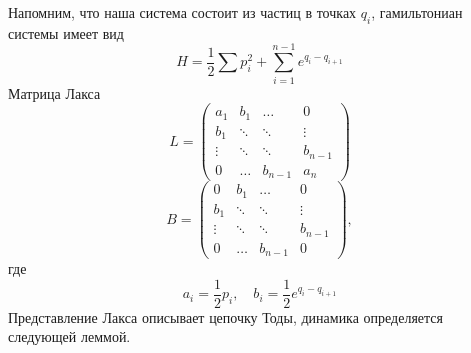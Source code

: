 \documentclass[a4paper,12pt]{article}
\theoremstyle{definition}
\theoremstyle{definition}
\theoremstyle{definition}
\begin{document}
Напомним, что наша система состоит из частиц в точках $q_{i}$, гамильтониан системы имеет вид
\begin{equation}
  \label{eq:1}
  H=\frac{1}{2}\sum p_{i}^{2}+ \sum_{i=1}^{n-1} e^{q_{i}-q_{i+1}}
\end{equation}
Матрица Лакса
\begin{equation}
  \label{eq:2}
  L=
  \left(
    \begin{array}{cccc}
      a_{1} & b_{1} & \dots & 0 \\
      b_{1} & \ddots & \ddots & \vdots \\
      \vdots & \ddots & \ddots & b_{n-1} \\
      0 & \dots & b_{n-1} & a_{n}
    \end{array}
  \right)
\end{equation}
\begin{equation}
  \label{eq:3}
  B=
  \left(
    \begin{array}{cccc}
      0 & b_{1} & \dots & 0 \\
      b_{1} & \ddots & \ddots & \vdots \\
      \vdots & \ddots & \ddots & b_{n-1} \\
      0 & \dots & b_{n-1} & 0
    \end{array}
  \right),
\end{equation}
где
\begin{equation}
  \label{eq:4}
  a_{i}=\frac{1}{2} p_{i}, \quad b_{i}=\frac{1}{2}e^{q_{i}-q_{i+1}}
\end{equation}
Представление Лакса описывает цепочку Тоды, динамика определяется следующей леммой.
\end{document}
